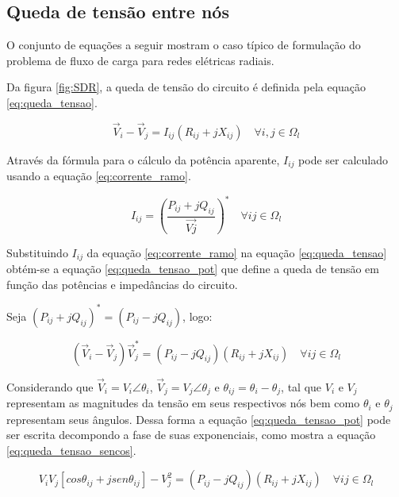 \subsection{Queda de tensão entre nós}

O conjunto de equações a seguir mostram o caso típico de formulação do problema de fluxo de carga para redes elétricas radiais.

Da figura \ref{fig:SDR}, a queda de tensão do circuito é definida pela equação \eqref{eq:queda_tensao}.

\begin{equation}
    \Vec{V}_{i} - \Vec{V}_{j} = I_{ij}(R_{ij} + jX_{ij})\quad\forall i,j \in \Omega_{l}
    \label{eq:queda_tensao}
\end{equation}


Através da fórmula para o cálculo da potência aparente, $I_{ij}$ pode ser calculado usando a equação \eqref{eq:corrente_ramo}.

\begin{equation}
    I_{ij} = \left(\frac{P_{ij} + jQ_{ij}}{\Vec{Vj}}\right)^{*}\quad\forall ij \in \Omega_{l}
    \label{eq:corrente_ramo}
\end{equation}

Substituindo $I_{ij}$ da equação \eqref{eq:corrente_ramo} na equação \eqref{eq:queda_tensao} obtém-se a equação \eqref{eq:queda_tensao_pot} que define a queda de tensão em função das potências e impedâncias do circuito.


Seja $(P_{ij} + jQ_{ij})^{*} = (P_{ij} - jQ_{ij})$, logo:

\begin{equation}
    (\Vec{V}_{i} - \Vec{V}_{j})\Vec{V}_{j}^{*} = (P_{ij} - jQ_{ij})(R_{ij} + jX_{ij}) \quad\forall ij \in \Omega_{l}
    \label{eq:queda_tensao_pot}
\end{equation}

Considerando que $\Vec{V}_{i} = V_{i}\angle{\theta_{i}}$, $\Vec{V}_{j} = V_{j}\angle{\theta_{j}}$ e $\theta_{ij} = \theta_{i} - \theta_{j}$, tal que  $V_{i}$ e $V_{j}$ representam as magnitudes da tensão em seus respectivos nós bem como $\theta_{i}$ e $\theta_{j}$ representam seus ângulos.
Dessa forma a equação \eqref{eq:queda_tensao_pot} pode ser escrita decompondo a fase de suas exponenciais, como mostra a equação \eqref{eq:queda_tensao_sencos}.

\begin{equation}\label{eq:queda_tensao_sencos}
    V_{i}V_{j}[cos\theta_{ij} + jsen\theta_{ij}] - V_{j}^{2} = (P_{ij} - jQ_{ij})(R_{ij} + jX_{ij}) \quad\forall ij \in \Omega_{l}
\end{equation}

